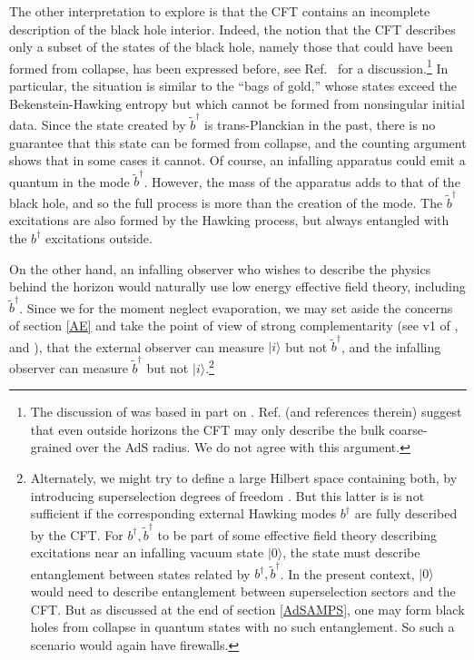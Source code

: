 \documentclass[12pt]{article}
\begin{document}
{{The other interpretation to explore is that the CFT contains an incomplete description of the black hole interior.  Indeed, the notion that the CFT describes only a subset of the states of the black hole, namely those that could have been formed from collapse, has been expressed before, see Ref.~\cite{Marolf:2008tx} for a discussion.\footnote{{The discussion of \cite{Marolf:2008tx} was based in part on \cite{Maldacena:2001kr,Freivogel:2005qh}.} {Ref. \cite{Gary:2009mi} (and references therein) suggest that even outside horizons the CFT may only describe the bulk coarse-grained over the AdS radius.  We do not agree with this argument.}}  In particular, the situation is similar to the ``bags of gold,'' whose states exceed the Bekenstein-Hawking entropy but which cannot be formed from nonsingular initial data. Since the state created by $\tilde b^\dagger$ is trans-Planckian in the past, there is no guarantee that this state can be formed from collapse, and the counting argument shows that in some cases it cannot.  Of course, an infalling apparatus could emit a quantum in the mode $\tilde b^\dagger$.  However, the mass of the apparatus adds to that of the black hole, and so the full process is more than the creation of the mode.  The  $\tilde b^\dagger$ excitations are also formed by the Hawking process, but always entangled with the $b^\dagger$ {excitations} outside.

On the other hand, an infalling observer who wishes to describe the physics behind the horizon would naturally use low energy effective field theory, including $\tilde b^\dagger$.  Since we for the moment neglect evaporation, we may set aside the concerns of section \ref{AE} and take the point of view of strong complementarity  {(see v1 of \cite{Bousso:2012as}, and \cite{Harlow:2013tf})}, that the external observer can measure $|i\rangle$ but not $\tilde b^\dagger$, and the infalling observer can measure $\tilde b^\dagger$ but not $|i\rangle$.\footnote{Alternately, we might try to define a large Hilbert space containing both, by introducing superselection degrees of freedom \cite{Marolf:2008tx,Marolf:2012xe}.
But this latter is is not sufficient if the corresponding external Hawking modes $b^\dagger$ are fully described by the CFT.  For $b^\dagger, \tilde b^\dagger$ to be part of some effective field theory describing excitations near an infalling vacuum state $|0\rangle$, the state must describe entanglement between states related by $b^\dagger, \tilde b^\dagger$.  In the present context,
$|0\rangle$ would need to describe entanglement between superselection sectors and the CFT.  But as discussed at the end of section \ref{AdSAMPS}, one may form black holes {from collapse} in quantum states with no such entanglement.  So such a scenario would again have firewalls.}

}}
\end{document}

